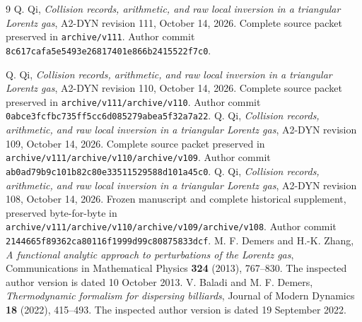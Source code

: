 \documentclass[11pt,reqno]{amsart}
\numberwithin{equation}{section}
\theoremstyle{definition}\newtheorem{definition}[theorem]{Definition}
\theoremstyle{remark}\newtheorem{remark}[theorem]{Remark}
\begin{document}













\appendix








\begin{thebibliography}{9}
 Q. Qi,
\emph{Collision records, arithmetic, and raw local inversion in a
triangular Lorentz gas}, A2-DYN revision 111, October 14, 2026.
Complete source packet preserved in \texttt{archive/v111}.
Author commit \texttt{8c617cafa5e5493e26817401e866b2415522f7c0}.

 Q. Qi,
\emph{Collision records, arithmetic, and raw local inversion in a
triangular Lorentz gas}, A2-DYN revision 110, October 14, 2026.
Complete source packet preserved in \texttt{archive/v111/archive/v110}.
Author commit \texttt{0abce3fcfbc735ff5cc6d085279abea5f32a7a22}.
 Q. Qi,
\emph{Collision records, arithmetic, and raw local inversion in a
triangular Lorentz gas}, A2-DYN revision 109, October 14, 2026.
Complete source packet preserved in \texttt{archive/v111/archive/v110/archive/v109}.
Author commit \texttt{ab0ad79b9c101b82c80e33511529588d101a45c0}.
 Q. Qi,
\emph{Collision records, arithmetic, and raw local inversion in a
triangular Lorentz gas}, A2-DYN revision 108, October 14, 2026.
Frozen manuscript and complete historical supplement, preserved
byte-for-byte in \texttt{archive/v111/archive/v110/archive/v109/archive/v108}. Author commit
\texttt{2144665f89362ca80116f1999d99c80875833dcf}.
 M. F. Demers and H.-K. Zhang,
\emph{A functional analytic approach to perturbations of the Lorentz gas},
Communications in Mathematical Physics \textbf{324} (2013), 767--830.
The inspected author version is dated 10 October 2013.
 V. Baladi and M. F. Demers,
\emph{Thermodynamic formalism for dispersing billiards},
Journal of Modern Dynamics \textbf{18} (2022), 415--493.
The inspected author version is dated 19 September 2022.
\end{thebibliography}
\end{document}
